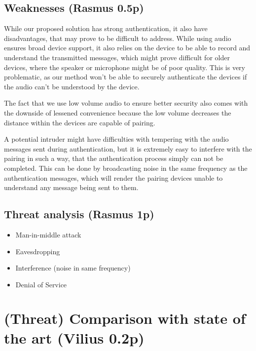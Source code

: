 \documentclass[12pt]{article}
\begin{document}
\subsection{Weaknesses (Rasmus 0.5p)}
\label{sub:Weaknesses}

While our proposed solution has strong authentication, it also have disadvantages, that may prove to be difficult to address. While using audio ensures broad device support, it also relies on the device to be able to record and understand the transmitted messages, which might prove difficult for older devices, where the speaker or microphone might be of poor quality. This is very problematic, as our method won't be able to securely authenticate the devices if the audio can't be understood by the device.

The fact that we use low volume audio to ensure better security also comes with the downside of lessened convenience because the low volume decreases the distance within the devices are capable of pairing.

A potential intruder might have difficulties with tempering with the audio messages sent during authentication, but it is extremely easy to interfere with the pairing in such a way, that the authentication process simply can not be completed. This can be done by broadcasting noise in the same frequency as the authentication messages, which will render the pairing devices unable to understand any message being sent to them.


\subsection{Threat analysis (Rasmus 1p)}
\label{sub:Threat analysis}

\begin{itemize}
    \item Man-in-middle attack
    \item Eavesdropping
    \item Interference (noise in same frequency)
    \item Denial of Service
\end{itemize}

\newpage

\section{(Threat) Comparison with state of the art (Vilius 0.2p)}
\label{sec:Comparison with state of the art}
\end{document}
